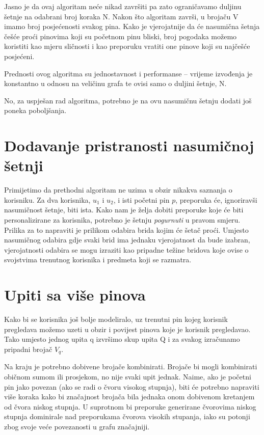 \documentclass[times, utf8, seminar]{fer}
\begin{document}
Jasno je da ovaj algoritam neće nikad završiti pa zato ograničavamo duljinu šetnje na odabrani broj koraka N. Nakon što algoritam završi, u brojaču V imamo broj posjećenosti svakog pina. Kako je vjerojatnije da će nasumična šetnja češće proći pinovima koji su početnom pinu bliski, broj pogodaka možemo koristiti kao mjeru sličnosti i kao preporuku vratiti one pinove koji su najčešće posjećeni.

Prednosti ovog algoritma su jednostavnost i performanse -- vrijeme izvođenja je konstantno u odnosu na veličinu grafa te ovisi samo o duljini šetnje, N.

No, za uspješan rad algoritma, potrebno je na ovu nasumičnu šetnju dodati još poneka poboljšanja.

\section{Dodavanje pristranosti nasumičnoj šetnji}

Primijetimo da prethodni algoritam ne uzima u obzir nikakva saznanja o korisniku. Za dva korisnika, $u_1$ i $u_2$, i isti početni pin $p$, preporuka će, ignoriravši nasumičnost šetnje, biti ista. Kako nam je želja dobiti preporuke koje će biti personalizirane za korisnika, potrebno je šetnju \textit{pogurnuti} u pravom smjeru. Prilika za to napraviti je prilikom odabira brida kojim će šetač proći. Umjesto nasumičnog odabira gdje svaki brid ima jednaku vjerojatnost da bude izabran, vjerojatnosti odabira se mogu izraziti kao pripadne težine bridova koje ovise o svojstvima trenutnog korisnika i predmeta koji se razmatra.

\section{Upiti sa više pinova}
\label{multipin}

Kako bi se korisnika još bolje modeliralo, uz trenutni pin kojeg korisnik pregledava možemo uzeti u obzir i povijest pinova koje je korisnik pregledavao. Tako umjesto jednog upita q izvršimo skup upita Q i za svakog izračunamo pripadni brojač $V_q$.

Na kraju je potrebno dobivene brojače kombinirati. Brojače bi mogli kombinirati običnom sumom ili prosjekom, no nije svaki upit jednak. Naime, ako je početni pin jako povezan (ako se radi o čvoru visokog stupnja), biti će potrebno napraviti više koraka kako bi značajnost brojača bila jednaka onom dobivenom kretanjem od čvora niskog stupnja. U suprotnom bi preporuke generirane čvorovima niskog stupnja dominirale nad preporukama čvorova visokih stupanja, iako su potonji zbog svoje veće povezanosti u grafu značajniji.
\end{document}
